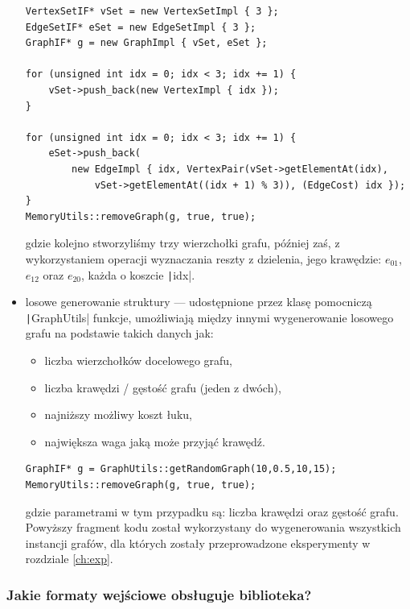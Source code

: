 \begin{itemize}
	\begin{verbatim}
VertexSetIF* vSet = new VertexSetImpl { 3 };
EdgeSetIF* eSet = new EdgeSetImpl { 3 };
GraphIF* g = new GraphImpl { vSet, eSet };

for (unsigned int idx = 0; idx < 3; idx += 1) {
	vSet->push_back(new VertexImpl { idx });
}

for (unsigned int idx = 0; idx < 3; idx += 1) {
	eSet->push_back(
		new EdgeImpl { idx, VertexPair(vSet->getElementAt(idx),
			vSet->getElementAt((idx + 1) % 3)), (EdgeCost) idx });
}
MemoryUtils::removeGraph(g, true, true);
	\end{verbatim}
	gdzie kolejno stworzyliśmy trzy wierzchołki grafu, później zaś, z wykorzystaniem operacji wyznaczania reszty z dzielenia,  jego krawędzie: $e_{01}$, $e_{12}$ oraz $e_{20}$, każda o koszcie \texttt|idx|.\\
	
	\item losowe generowanie struktury --- udostępnione przez klasę pomocniczą \texttt|GraphUtils| funkcje, umożliwiają między innymi wygenerowanie losowego grafu na podstawie takich danych jak:
	\begin{itemize}
		\item liczba wierzchołków docelowego grafu,
		\item liczba krawędzi / gęstość grafu (jeden z dwóch),
		\item najniższy możliwy koszt łuku,
		\item największa waga jaką może przyjąć krawędź.
	\end{itemize}

	\begin{verbatim}
GraphIF* g = GraphUtils::getRandomGraph(10,0.5,10,15);
MemoryUtils::removeGraph(g, true, true);
	\end{verbatim}
	gdzie parametrami w tym przypadku są: liczba krawędzi oraz gęstość grafu. Powyższy fragment kodu został wykorzystany do wygenerowania wszystkich instancji grafów, dla których zostały przeprowadzone eksperymenty w rozdziale \ref{ch:exp}.
	
\end{itemize}




\subsubsection{Jakie formaty wejściowe obsługuje biblioteka?}

